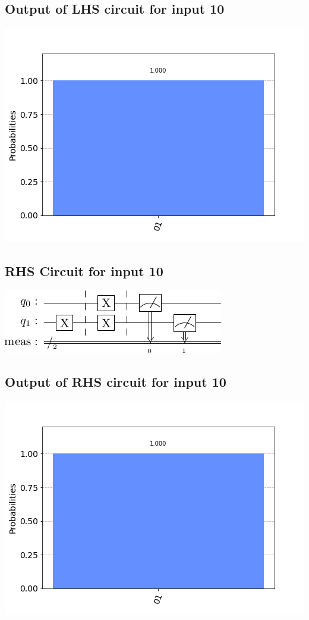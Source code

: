 \documentclass[a4paper]{article}
\begin{document}
\begin{answer}[Question 1 b (a)]
        \subsection*{Output of LHS circuit for input 10}
        \includegraphics[scale = 0.5]{a110-out.png}
        \subsection*{RHS Circuit for input 10}
        \includegraphics[scale=0.5]{a210.png}
        \subsection*{Output of RHS circuit for input 10}
        \includegraphics[scale = 0.5]{a210-out.png}

\end{answer}
\end{document}
